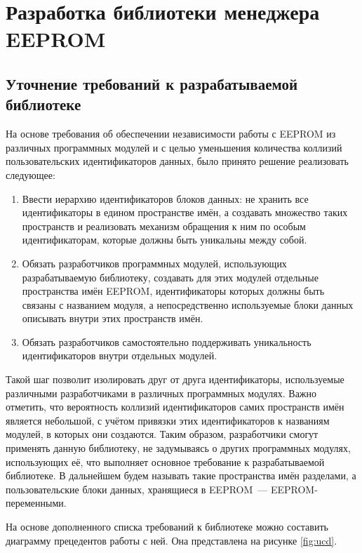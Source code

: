 \chapter{Разработка библиотеки менеджера EEPROM}

\section{Уточнение требований к разрабатываемой библиотеке}

На основе требования об обеспечении независимости работы с EEPROM из различных программных модулей и с целью уменьшения количества коллизий пользовательских идентификаторов данных, было принято решение реализовать следующее:
\begin{enumerate}
	\item Ввести иерархию идентификаторов блоков данных: не хранить все идентификаторы в едином пространстве имён, а создавать множество таких пространств и реализовать механизм обращения к ним по особым идентификаторам, которые должны быть уникальны между собой.
	\item Обязать разработчиков программных модулей, использующих разрабатываемую библиотеку, создавать для этих модулей отдельные пространства имён EEPROM, идентификаторы которых должны быть связаны с названием модуля, а непосредственно используемые блоки данных описывать внутри этих пространств имён.
	\item Обязать разработчиков самостоятельно поддерживать уникальность идентификаторов внутри отдельных модулей.
\end{enumerate}

Такой шаг позволит изолировать друг от друга идентификаторы, используемые различными разработчиками в различных программных модулях.
Важно отметить, что вероятность коллизий идентификаторов самих пространств имён является небольшой, с учётом привязки этих идентификаторов к названиям модулей, в которых они создаются.
Таким образом, разработчики смогут применять данную библиотеку, не задумываясь о других программных модулях, использующих её, что выполняет основное требование к разрабатываемой библиотеке.
В дальнейшем будем называть такие пространства имён разделами, а пользовательские блоки данных, хранящиеся в EEPROM~--- EEPROM-переменными.

На основе дополненного списка требований к библиотеке можно составить диаграмму прецедентов работы с ней. Она представлена на рисунке \ref{fig:ucd}.


